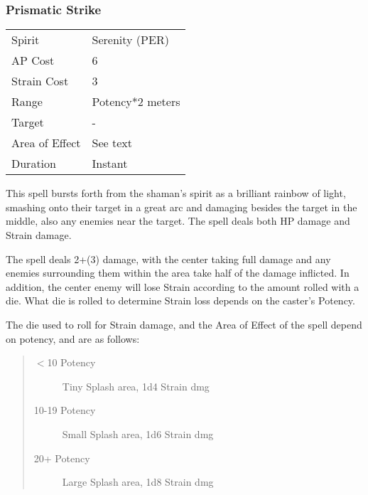 \documentclass[11pt,a4paper,twocolumn]{book}
\begin{document}
\subsubsection*{Prismatic Strike}
{
	\begin{tabu} to 75mm{| X[l,4] | X[l,7] |}
		\hline
		Spirit         & Serenity (PER)   \\
		AP Cost        & 6                \\
		Strain Cost    & 3                \\
		Range          & Potency*2 meters \\
		Target         & -                \\
		Area of Effect & See text         \\
		Duration       & Instant          \\ \hline
	\end{tabu}
	
}

\medskip

This spell bursts forth from the shaman's spirit as a brilliant rainbow of light, smashing onto their target in a great arc and damaging besides the target in the middle, also any enemies near the target. The spell deals both HP damage and Strain damage.

The spell deals 2+(3) damage, with the center taking full damage and any enemies surrounding them within the area take half of the damage inflicted. In addition, the center enemy will lose Strain according to the amount rolled with a die. What die is rolled to determine Strain loss depends on the caster's Potency.

The die used to roll for Strain damage, and the Area of Effect of the spell depend on potency, and are as follows:

\begin{quote}
	\begin{description}
		\item[$<$10 Potency] 	Tiny Splash area, 1d4 Strain dmg
		\item[10-19 Potency] 	Small Splash area, 1d6 Strain dmg
		\item[20+ Potency] 		Large Splash area, 1d8 Strain dmg
	\end{description}	
\end{quote}
\end{document}
